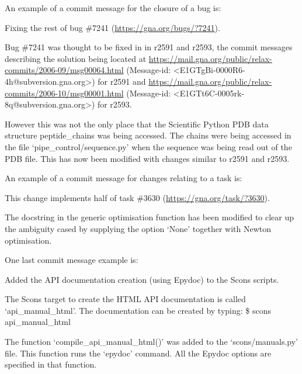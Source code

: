 An example of a commit message for the closure of a bug is:

\begin{exampleenv}
Fixing the rest of bug \#7241 (\href{https://gna.org/bugs/?7241}{https://gna.org/bugs/?7241}).

Bug \#7241 was thought to be fixed in in r2591 and r2593, the commit messages describing the solution
being located at \href{https://mail.gna.org/public/relax-commits/2006-09/msg00064.html}{https://mail.gna.org/public/relax-commits/2006-09/msg00064.html} (Message-id:
<E1GTgBi-0000R6-4h@subversion.gna.org>) for r2591 and
\href{https://mail.gna.org/public/relax-commits/2006-10/msg00001.html}{https://mail.gna.org/public/relax-commits/2006-10/msg00001.html} (Message-id:
<E1GTt6C-0005rk-8q@subversion.gna.org>) for r2593.

However this was not the only place that the Scientific Python PDB data structure peptide\_chains was
being accessed.  The chains were being accessed in the file `pipe\_control/sequence.py' when the
sequence was being read out of the PDB file.  This has now been modified with changes similar to
r2591 and r2593.
\end{exampleenv}

An example of a commit message for changes relating to a task is:

\begin{exampleenv}
This change implements half of task \#3630 (\href{https://gna.org/task/?3630}{https://gna.org/task/?3630}).

The docstring in the generic optimisation function has been modified to clear up the ambiguity cased
by supplying the option `None' together with Newton optimisation.
\end{exampleenv}

One last commit message example is:

\begin{exampleenv}
Added the API documentation creation (using Epydoc) to the Scons scripts.

The Scons target to create the HTML API documentation is called `api\_manual\_html'.  The
documentation can be created by typing:
\$ scons api\_manual\_html

The function `compile\_api\_manual\_html()' was added to the `scons/manuals.py' file.  This function
runs the `epydoc' command.  All the Epydoc options are specified in that function.
\end{exampleenv}



